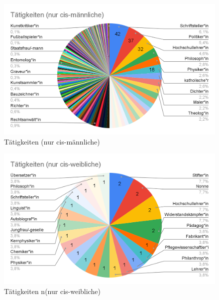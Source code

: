 \documentclass[ngerman,twocolumn,showpacs,%
  nofootinbib,aps,superscriptaddress,%
  eqsecnum,prd,notitlepage,showkeys,10pt,report]{revtex4-2}
\begin{document}
\begin{figure}
\centering
\includegraphics[width=1\linewidth,frame]{7.png}
\caption{Tätigkeiten (nur cis-männliche)}
\label{fig:JobsOnlyMale}
\end{figure}
\begin{figure}
\centering
\includegraphics[width=1\linewidth,frame]{8.png}
\caption{Tätigkeiten n(nur cis-weibliche)}
\label{fig:JobsOnlyFemale}
\end{figure}
\end{document}
